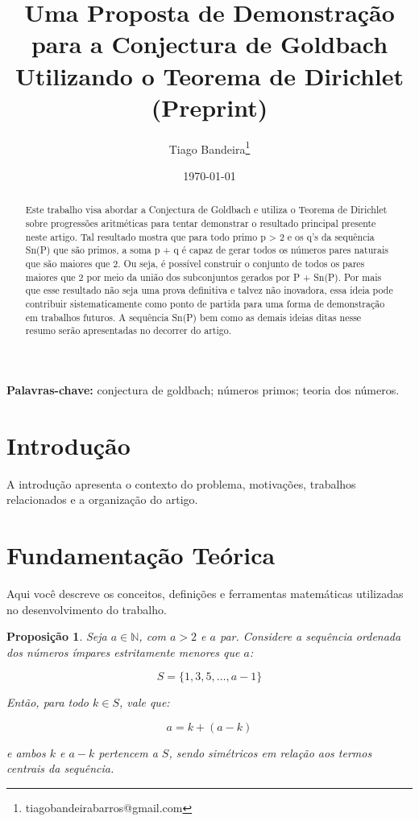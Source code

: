\documentclass[a4paper,11pt]{article}
\title{\textbf{Uma Proposta de Demonstração para a Conjectura de Goldbach Utilizando o Teorema de Dirichlet}\\
	\large (Preprint)}
\author{
	Tiago Bandeira\thanks{tiagobandeirabarros@gmail.com} 
}
\date{\today}
\newtheorem{proposition}[theorem]{Proposição}
\theoremstyle{definition}
\theoremstyle{remark}
\begin{document}
	
	\maketitle
	
	\begin{abstract}
		Este trabalho visa abordar a Conjectura de Goldbach e utiliza o Teorema de Dirichlet sobre progressões aritméticas para tentar demonstrar o resultado principal presente neste artigo. Tal resultado mostra que para todo primo p > 2 e os q's da sequência S{n}(P) que são primos, a soma p + q é capaz de gerar todos os números pares naturais que são maiores que 2. Ou seja, é possível construir o conjunto de todos os pares maiores que 2 por meio da união dos subconjuntos gerados por P + S{n}(P). Por mais que esse resultado não seja uma prova definitiva e talvez não inovadora, essa ideia pode contribuir sistematicamente como ponto de partida para uma forma de demonstração em trabalhos futuros. A sequência  S{n}(P) bem como as demais ideias ditas nesse resumo serão apresentadas no decorrer do artigo.
	\end{abstract}
	
	\textbf{Palavras-chave:} conjectura de goldbach; números primos; teoria dos números.
	
	\vspace{1cm}
	
	\section{Introdução}
	
	A introdução apresenta o contexto do problema, motivações, trabalhos relacionados e a organização do artigo.
	
	\section{Fundamentação Teórica}
	
	Aqui você descreve os conceitos, definições e ferramentas matemáticas utilizadas no desenvolvimento do trabalho.
	\begin{proposition}
		Seja $a \in \mathbb{N}$, com $a > 2$ e $a$ par. Considere a sequência ordenada dos números ímpares estritamente menores que $a$:
		
		\[
		S = \{1, 3, 5, \dotsc, a - 1\}
		\]
		
		Então, para todo $k \in S$, vale que:
		
		\[
		a = k + (a - k)
		\]
		
		e ambos $k$ e $a - k$ pertencem a $S$, sendo simétricos em relação aos termos centrais da sequência.
	\end{proposition}
	
\end{document}
